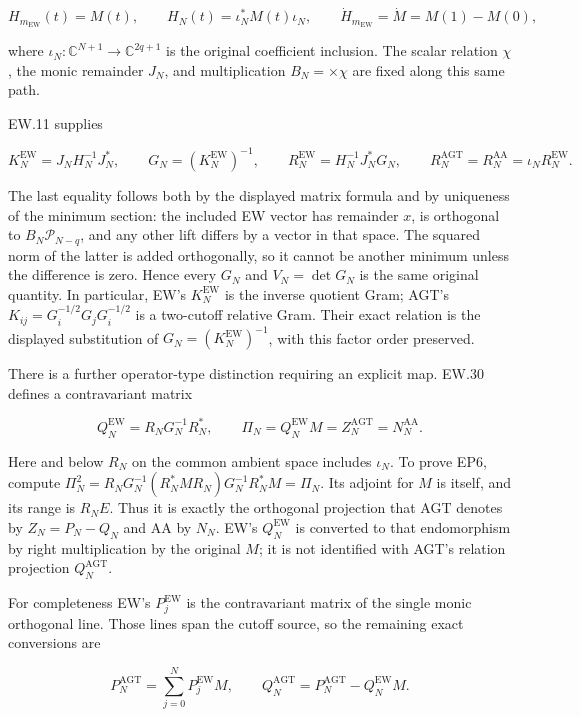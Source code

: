 \[
H_{m_{\mathrm{EW}}}(t)=M(t),\qquad
H_N(t)=\iota_N^*M(t)\iota_N,
\qquad \dot H_{m_{\mathrm{EW}}}=\dot M=M(1)-M(0),
\tag{EP4}
\]

where \(\iota_N:\mathbb{C}^{N+1}\to\mathbb{C}^{2q+1}\) is the original coefficient inclusion. The scalar relation \(\chi\), the monic remainder \(J_N\), and multiplication \(B_N=\times\chi\) are fixed along this same path.

EW.11 supplies

\[
K_N^{\mathrm{EW}}=J_NH_N^{-1}J_N^*,\qquad
G_N=(K_N^{\mathrm{EW}})^{-1},\qquad
R_N^{\mathrm{EW}}=H_N^{-1}J_N^*G_N,
\qquad R_N^{\mathrm{AGT}}=R_N^{\mathrm{AA}}=\iota_NR_N^{\mathrm{EW}}.
\tag{EP5}
\]

The last equality follows both by the displayed matrix formula and by uniqueness of the minimum section: the included EW vector has remainder \(x\), is orthogonal to \(B_N\mathcal P_{N-q}\), and any other lift differs by a vector in that space. The squared norm of the latter is added orthogonally, so it cannot be another minimum unless the difference is zero. Hence every \(G_N\) and \(V_N=\det G_N\) is the same original quantity. In particular, EW's \(K_N^{\mathrm{EW}}\) is the inverse quotient Gram; AGT's \(K_{ij}=G_i^{-1/2}G_jG_i^{-1/2}\) is a two-cutoff relative Gram. Their exact relation is the displayed substitution of \(G_N=(K_N^{\mathrm{EW}})^{-1}\), with this factor order preserved.

There is a further operator-type distinction requiring an explicit map. EW.30 defines a contravariant matrix

\[
Q_N^{\mathrm{EW}}
=R_NG_N^{-1}R_N^*,\qquad
\Pi_N=Q_N^{\mathrm{EW}}M
=Z_N^{\mathrm{AGT}}=N_N^{\mathrm{AA}}.
\tag{EP6}
\]

Here and below \(R_N\) on the common ambient space includes \(\iota_N\). To prove EP6, compute \(\Pi_N^2=R_NG_N^{-1}(R_N^*MR_N)G_N^{-1}R_N^*M=\Pi_N\). Its adjoint for \(M\) is itself, and its range is \(R_NE\). Thus it is exactly the orthogonal projection that AGT denotes by \(Z_N=P_N-Q_N\) and AA by \(N_N\). EW's \(Q_N^{\mathrm{EW}}\) is converted to that endomorphism by right multiplication by the original \(M\); it is not identified with AGT's relation projection \(Q_N^{\mathrm{AGT}}\).

For completeness EW's \(P_j^{\mathrm{EW}}\) is the contravariant matrix of the single monic orthogonal line. Those lines span the cutoff source, so the remaining exact conversions are

\[
P_N^{\mathrm{AGT}}=\sum_{j=0}^N P_j^{\mathrm{EW}}M,
\qquad
Q_N^{\mathrm{AGT}}=P_N^{\mathrm{AGT}}-Q_N^{\mathrm{EW}}M.
\tag{EP7}
\]


